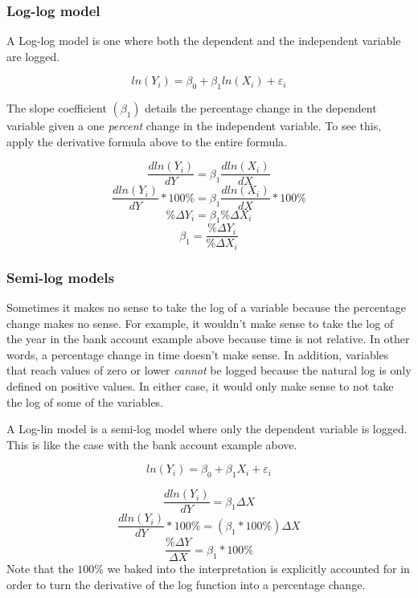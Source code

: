 \documentclass[
]{book}
\begin{document}
\hypertarget{log-log-model}{%
\subsubsection*{Log-log model}\label{log-log-model}}

A Log-log model is one where both the dependent and the independent variable are logged.

\[ln(Y_i)=\beta_0 + \beta_1 ln(X_i) + \varepsilon_i\]

The slope coefficient \((\beta_1)\) details the percentage change in the dependent variable given a one \emph{percent} change in the independent variable. To see this, apply the derivative formula above to the entire formula.

\[\frac{dln(Y_i)}{dY} = \beta_1 \frac{dln(X_i)}{dX}\]
\[\frac{dln(Y_i)}{dY} * 100\% = \beta_1 \frac{dln(X_i)}{dX} * 100\%\]
\[\%\Delta Y_i = \beta_1 \%\Delta X_i\]
\[ \beta_1 =\frac{\%\Delta Y_i}{\%\Delta X_i}\]

\hypertarget{semi-log-models}{%
\subsubsection*{Semi-log models}\label{semi-log-models}}

Sometimes it makes no sense to take the log of a variable because the percentage change makes no sense. For example, it wouldn't make sense to take the log of the year in the bank account example above because time is not relative. In other words, a percentage change in time doesn't make sense. In addition, variables that reach values of zero or lower \emph{cannot} be logged because the natural log is only defined on positive values. In either case, it would only make sense to not take the log of some of the variables.

A Log-lin model is a semi-log model where only the dependent variable is logged. This is like the case with the bank account example above.

\[ln(Y_i)=\beta_0 + \beta_1 X_i + \varepsilon_i\]

\[\frac{dln(Y_i)}{dY} = \beta_1 \Delta X\]
\[\frac{dln(Y_i)}{dY} * 100\% = (\beta_1 * 100\%)\Delta X\]
\[\frac{\% \Delta Y}{\Delta X}= \beta_1 * 100\%\]
Note that the \(100\%\) we baked into the interpretation is explicitly accounted for in order to turn the derivative of the log function into a percentage change.
\end{document}
